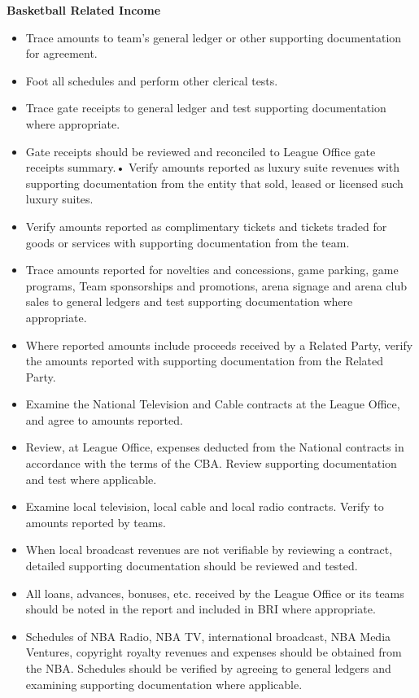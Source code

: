 \documentclass[
]{book}
\providecommand{\tightlist}{%
  \setlength{\itemsep}{0pt}\setlength{\parskip}{0pt}}
\begin{document}
\textbf{Basketball Related Income}

\begin{itemize}
\tightlist
\item
  Trace amounts to team's general ledger or other supporting documentation for agreement.
\item
  Foot all schedules and perform other clerical tests.
\item
  Trace gate receipts to general ledger and test supporting documentation where appropriate.
\item
  Gate receipts should be reviewed and reconciled to League Office gate receipts summary.• Verify amounts reported as luxury suite revenues with supporting documentation from the entity that sold, leased or licensed such luxury suites.
\item
  Verify amounts reported as complimentary tickets and tickets traded for goods or services with supporting documentation from the team.
\item
  Trace amounts reported for novelties and concessions, game parking, game programs, Team sponsorships and promotions, arena signage and arena club sales to general ledgers and test supporting documentation where appropriate.
\item
  Where reported amounts include proceeds received by a Related Party, verify the amounts reported with supporting documentation from the Related Party.
\item
  Examine the National Television and Cable contracts at the League Office, and agree to amounts reported.
\item
  Review, at League Office, expenses deducted from the National contracts in accordance with the terms of the CBA. Review supporting documentation and test where applicable.
\item
  Examine local television, local cable and local radio contracts. Verify to amounts reported by teams.
\item
  When local broadcast revenues are not verifiable by reviewing a contract, detailed supporting documentation should be reviewed and tested.
\item
  All loans, advances, bonuses, etc. received by the League Office or its teams should be noted in the report and included in BRI where appropriate.
\item
  Schedules of NBA Radio, NBA TV, international broadcast, NBA Media Ventures, copyright royalty revenues and expenses should be obtained from the NBA. Schedules should be verified by agreeing to general ledgers and examining supporting documentation where applicable.

\end{itemize}
\end{document}
